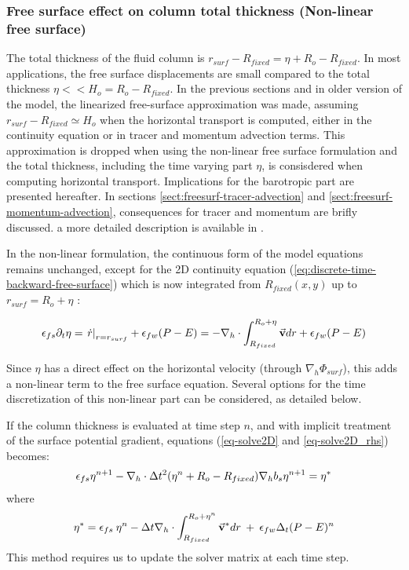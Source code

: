 \subsubsection{Free surface effect on column total thickness
(Non-linear free surface)}

The total thickness of the fluid column is $r_{surf} - R_{fixed} =
\eta + R_o - R_{fixed}$. In most applications, the free surface 
displacements are small compared to the total thickness
$\eta << H_o = R_o - R_{fixed}$. 
In the previous sections and in older version of the model,
the linearized free-surface approximation was made, assuming
$r_{surf} - R_{fixed} \simeq H_o$ when the horizontal transport is 
computed, either in the continuity equation or in tracer and momentum 
advection terms.
This approximation is dropped when using the non-linear free surface
formulation and the total thickness, including the time varying part
$\eta$, is consisdered when computing horizontal transport.
Implications for the barotropic part are presented hereafter.
In sections \ref{sect:freesurf-tracer-advection} and
\ref{sect:freesurf-momentum-advection}, consequences for tracer 
and momentum are brifly discussed. a more detailed description
is available in \cite{campin:02}.


In the non-linear formulation, the continuous form of the model equations 
remains unchanged, except for the 2D continuity equation 
(\ref{eq:discrete-time-backward-free-surface}) which is now
integrated from $R_{fixed}(x,y)$ up to $r_{surf}=R_o+\eta$ :

\begin{displaymath}
\epsilon_{fs} \partial_t \eta =
\left. \dot{r} \right|_{r=r_{surf}} + \epsilon_{fw} (P-E) =
- {\bf \nabla}_h \cdot \int_{R_{fixed}}^{R_o+\eta} \vec{\bf v} dr
+ \epsilon_{fw} (P-E)
\end{displaymath}

Since $\eta$ has a direct effect on the horizontal velocity (through
$\nabla_h \Phi_{surf}$), this adds a non-linear term to the free
surface equation. Several options for the time discretization of this
non-linear part can be considered, as detailed below.

If the column thickness is evaluated at time step $n$, and with
implicit treatment of the surface potential gradient, equations
(\ref{eq-solve2D} and \ref{eq-solve2D_rhs}) becomes:
\begin{eqnarray*}
\epsilon_{fs} {\eta}^{n+1} -
{\bf \nabla}_h \cdot \Delta t^2 (\eta^{n}+R_o-R_{fixed})
{\bf \nabla}_h b_s {\eta}^{n+1}
= {\eta}^*
\end{eqnarray*}
where
\begin{eqnarray*}
{\eta}^* = \epsilon_{fs} \: {\eta}^{n} -
\Delta t {\bf \nabla}_h \cdot \int_{R_{fixed}}^{R_o+\eta^n} \vec{\bf v}^* dr
\: + \: \epsilon_{fw} \Delta_t (P-E)^{n}
\end{eqnarray*} 
This method requires us to update the solver matrix at each time step.

